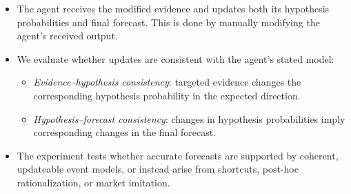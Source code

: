 \documentclass{article}
\begin{document}
\begin{itemize}
    \item  The agent receives the modified evidence and updates both its hypothesis probabilities and final forecast. This is done by manually modifying the agent's received output.

    \item  We evaluate whether updates are consistent with the agent's stated model:
    \begin{itemize}
        \item \emph{Evidence--hypothesis consistency}: targeted evidence changes the corresponding hypothesis probability in the expected direction.
        \item \emph{Hypothesis--forecast consistency}: changes in hypothesis probabilities imply corresponding changes in the final forecast.
    \end{itemize}

    \item The experiment tests whether accurate forecasts are supported by coherent, updateable event models, or instead arise from shortcuts, post-hoc rationalization, or market imitation.
\end{itemize}

\newpage
\end{document}
